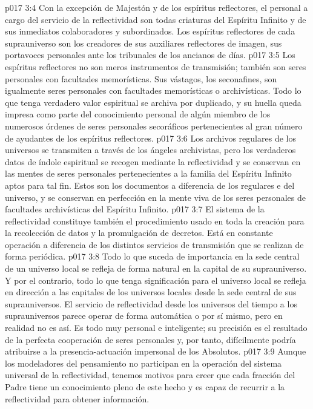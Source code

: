 \vs p017 3:4 Con la excepción de Majestón y de los espíritus reflectores, el personal a cargo del servicio de la reflectividad son todas criaturas del Espíritu Infinito y de sus inmediatos colaboradores y subordinados. Los espíritus reflectores de cada suprauniverso son los creadores de sus auxiliares reflectores de imagen, sus portavoces personales ante los tribunales de los ancianos de días.
\vs p017 3:5 \pc Los espíritus reflectores no son meros instrumentos de transmisión; también son seres personales con facultades memorísticas. Sus vástagos, los seconafines, son igualmente seres personales con facultades memorísticas o archivísticas. Todo lo que tenga verdadero valor espiritual se archiva por duplicado, y su huella queda impresa como parte del conocimiento personal de algún miembro de los numerosos órdenes de seres personales secoráficos pertenecientes al gran número de ayudantes de los espíritus reflectores.
\vs p017 3:6 Los archivos regulares de los universos se transmiten a través de los ángeles archivistas, pero los verdaderos datos de índole espiritual se recogen mediante la reflectividad y se conservan en las mentes de seres personales pertenecientes a la familia del Espíritu Infinito aptos para tal fin. Estos son los documentos  a diferencia de los regulares e  del universo, y se conservan en perfección en la mente viva de los seres personales de facultades archivísticas del Espíritu Infinito.
\vs p017 3:7 El sistema de la reflectividad constituye también el procedimiento usado en toda la creación para la recolección de datos y la promulgación de decretos. Está en constante operación a diferencia de los distintos servicios de transmisión que se realizan de forma periódica.
\vs p017 3:8 Todo lo que suceda de importancia en la sede central de un universo local se refleja de forma natural en la capital de su suprauniverso. Y por el contrario, todo lo que tenga significación para el universo local se refleja en dirección a las capitales de los universos locales desde la sede central de sus suprauniversos. El servicio de reflectividad desde los universos del tiempo a los suprauniversos parece operar de forma automática o por sí mismo, pero en realidad no es así. Es todo muy personal e inteligente; su precisión es el resultado de la perfecta cooperación de seres personales y, por tanto, difícilmente podría atribuirse a la presencia\hyp{}actuación impersonal de los Absolutos.
\vs p017 3:9 Aunque los modeladores del pensamiento no participan en la operación del sistema universal de la reflectividad, tenemos motivos para creer que cada fracción del Padre tiene un conocimiento pleno de este hecho y es capaz de recurrir a la reflectividad para obtener información.
